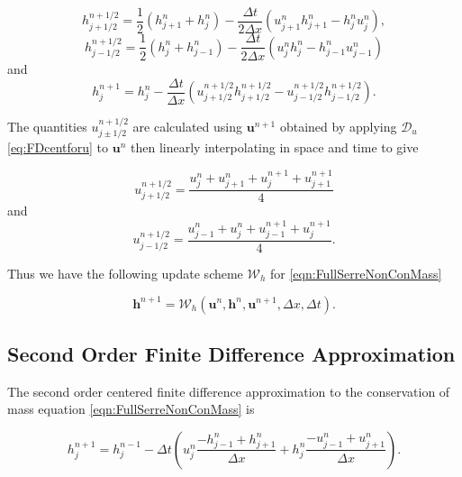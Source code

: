 	\begin{equation*}
	h^{n + 1/2}_{j+ 1/2} = \frac{1}{2}\left(h^{n}_{j+1} + h^{n}_j\right) - \frac{\Delta t}{2\Delta x}\left(u^n_{j+1}h^n_{j+1} - h^n_{j}u^n_{j}\right),
	\end{equation*}
	\begin{equation*}
	h^{n + 1/2}_{j- 1/2} = \frac{1}{2}\left(h^{n}_{j} + h^{n}_{j-1}\right) - \frac{\Delta t}{2\Delta x}\left(u^n_{j}h^n_{j} - h^n_{j-1}u^n_{j-1}\right)
	\end{equation*}
	and
	\begin{equation*}
	h^{n+1}_j = h^{n}_j - \frac{\Delta t}{\Delta x}\left(u^{n + 1/2}_{j+ 1/2}h^{n + 1/2}_{j+ 1/2} - u^{n + 1/2}_{j- 1/2}h^{n + 1/2}_{j- 1/2}\right).
	\label{eq:LW4h}
	\end{equation*}

The quantities $u^{n + 1/2}_{j \pm 1/2}$ are calculated using $\boldsymbol{u}^{n+1}$ obtained by applying $\mathcal{D}_u$ \eqref{eq:FDcentforu} to $\boldsymbol{u}^{n}$  then linearly interpolating in space and time to give

	\begin{equation*}
	u^{n + 1/2}_{j+ 1/2} = \frac{ u^{n}_{j} + u^{n}_{j+1} + u^{n+1}_{j} +   u^{n+1}_{j+1}  }{4}
	\end{equation*}
	and
	\begin{equation*}
	u^{n + 1/2}_{j- 1/2} = \frac{u^{n}_{j-1}  + u^{n}_{j}+ u^{n+1}_{j-1} + u^{n+1}_{j}   }{4}.
	\end{equation*}

Thus we have the following update scheme $\mathcal{W}_h$ for \eqref{eqn:FullSerreNonConMass}

	\begin{equation}
	\boldsymbol{h}^{n+1} = \mathcal{W}_h\left(\boldsymbol{u}^n,\boldsymbol{h}^n,\boldsymbol{u}^{n+1}, \Delta x, \Delta t \right). 
	\label{eq:LWupdateh}
	\end{equation}

\subsection{Second Order Finite Difference Approximation}

The second order centered finite difference approximation to the conservation of mass equation \eqref{eqn:FullSerreNonConMass} is

	\begin{equation*}
	h^{n+1}_j = h^{n-1}_j - \Delta t \left(u^{n}_{j}\frac{ - h^{n}_{j-1} + h^{n}_{j+1}}{\Delta x} + h^{n}_{j}\frac{- u^{n}_{j-1} + u^{n}_{j+1}}{\Delta x}\right).
	\end{equation*}

